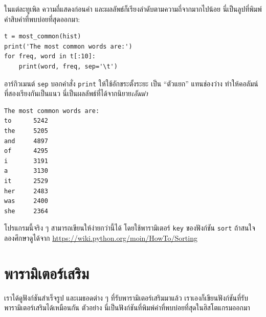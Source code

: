 
ในแต่ละทูเพิล ความถี่แสดงก่อนคำ 
และผลลัพธ์ก็เรียงลำดับตามความถี่จากมากไปน้อย
นี่เป็นลูปที่พิมพ์คำสิบคำที่พบบ่อยที่สุดออกมา:

\begin{verbatim}
t = most_common(hist)
print('The most common words are:')
for freq, word in t[:10]:
    print(word, freq, sep='\t')
\end{verbatim}
%
%
อาร์กิวเมนต์ \texttt{sep} บอกคำสั่ง \texttt{print} ให้ใช้อักขระตั้งระยะ
เป็น ``ตัวแยก'' แทนช่องว่าง
ทำให้คอลัมน์ที่สองเรียงกันเป็นแนว
นี่เป็นผลลัพธ์ที่ได้จากนิยาย\textit{เอ็มม่า} 

\begin{verbatim}
The most common words are:
to      5242
the     5205
and     4897
of      4295
i       3191
a       3130
it      2529
her     2483
was     2400
she     2364
\end{verbatim}
%
%
โปรแกรมนี้จริง ๆ สามารถเขียนให้ง่ายกว่านี้ได้ โดยใช้พารามิเตอร์ \texttt{key} ของฟังก์ชัน \texttt{sort}
ถ้าสนใจ ลองศึกษาดูได้จาก \url{https://wiki.python.org/moin/HowTo/Sorting}

\section{พารามิเตอร์เสริม}


เราได้ดูฟังก์ชันสำเร็จรูป และเมธอดต่าง ๆ
ที่รับพารามิเตอร์เสริมมาแล้ว
เราเองก็เขียนฟังก์ชันที่รับพารามิเตอร์เสริมได้เหมือนกัน
ตัวอย่าง นี่เป็นฟังก์ชันที่พิมพ์คำที่พบบ่อยที่สุดในฮิสโตแกรมออกมา


